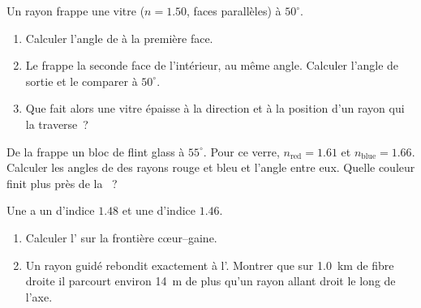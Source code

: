 \begin{exercise}[$\star\star$]\label{exo:g10:refraction:9}
Un rayon frappe une vitre ($n = 1.50$, faces parallèles) à $50^\circ$.
\begin{enumerate}
  \item Calculer l'angle de  à la première face.
  \item Le  frappe la seconde face de l'intérieur, au
        même angle. Calculer l'angle de sortie et le comparer à
        $50^\circ$.
  \item Que fait alors une vitre épaisse à la direction et à la
        position d'un rayon qui la traverse~?
\end{enumerate}
\end{exercise}

\begin{exercise}[$\star\star$]\label{exo:g10:refraction:10}
De la  frappe un bloc de flint glass à $55^\circ$.
Pour ce verre, $n_{\text{red}} = 1.61$ et $n_{\text{blue}} = 1.66$.
Calculer les angles de  des rayons rouge et bleu et
l'angle entre eux. Quelle couleur finit plus près de la
~?
\end{exercise}

\begin{exercise}[$\star\star$]\label{exo:g10:refraction:11}
Une  a un  d'indice $1.48$ et une
 d'indice $1.46$.
\begin{enumerate}
  \item Calculer l' sur la frontière cœur--gaine.
  \item Un rayon guidé rebondit exactement à l'.
        Montrer que sur \qty{1.0}{km} de fibre droite il parcourt environ
        \qty{14}{m} de plus qu'un rayon allant droit le long de l'axe.
\end{enumerate}
\end{exercise}

